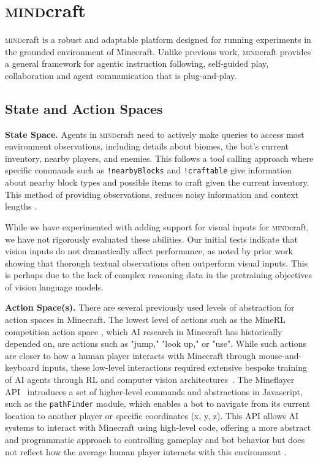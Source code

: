 \documentclass{article}
\newcommand{\mindcraft}{\textsc{mind}craft}
\begin{document}
\section{\mindcraft} \label{sec: mindcraft}
\mindcraft{} is a robust and adaptable platform designed for running experiments in the grounded environment of Minecraft. 
Unlike previous work, \mindcraft{} provides a general framework for agentic instruction following, self-guided play, collaboration and agent communication that is plug-and-play.

\subsection{State and Action Spaces}
\textbf{State Space.} 
Agents in \mindcraft{} need to actively make queries to access most environment observations, including details about biomes, the bot's current inventory, nearby players, and enemies. 
This follows a tool calling approach where specific commands such as \verb_!nearbyBlocks_ and \verb_!craftable_ give information about nearby block types and possible items to craft given the current inventory.
This method of providing observations, reduces noisy information and context lengths \citep{nottingham2024}.

While we have experimented with adding support for visual inputs for \mindcraft, we have not rigorously evaluated these abilities. 
Our initial tests indicate that vision inputs do not dramatically affect performance, as noted by prior work \citep{wu2025mind} showing that thorough textual observations often outperform visual inputs.
This is perhaps due to the lack of complex reasoning data in the pretraining objectives of vision language models.

\textbf{Action Space(s).}
There are several previously used levels of abstraction for action spaces in Minecraft.
The lowest level of actions such as the MineRL competition action space \cite{kanervisto2022minerl}, which AI research in Minecraft has historically depended on, are actions such as "jump," "look up," or "use".
While such actions are closer to how a human player interacts with Minecraft through mouse-and-keyboard inputs, these low-level interactions required extensive bespoke training of AI agents through RL and computer vision architectures~\citep{baker2022video}.
The Mineflayer API~\citep{mineflayer} introduces a set of higher-level commands and abstractions in Javascript, such as the \texttt{pathFinder} module, which enables a bot to navigate from its current location to another player or specific coordinates (x, y, z). 
This API allows AI systems to interact with Minecraft using high-level code, offering a more abstract and programmatic approach to controlling gameplay and bot behavior but does not reflect how the average human player interacts with this environment \cite{wangvoyager}.
\end{document}
